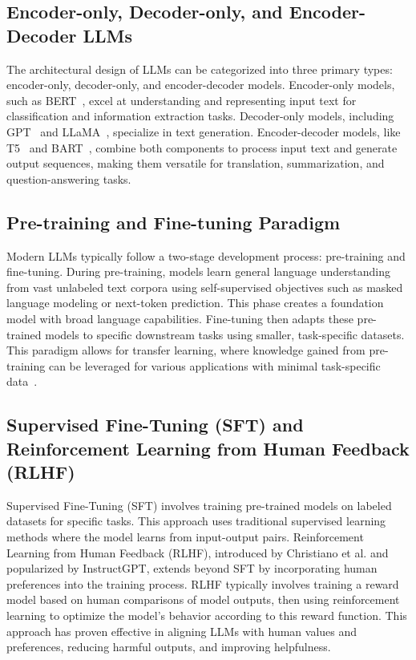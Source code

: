 \subsection{Encoder-only, Decoder-only, and Encoder-Decoder LLMs}
The architectural design of LLMs can be categorized into three primary 
types: encoder-only, decoder-only, and encoder-decoder models.
Encoder-only models, such as BERT~\cite{devlin2019}, excel at understanding
and representing input text for classification and information extraction 
tasks. Decoder-only models, including GPT~\cite{brown2020} and 
LLaMA~\cite{grattafiori2024llama3herdmodels}, specialize in text 
generation. Encoder-decoder models, like T5~\cite{ni2021sentencet5scalablesentenceencoders} and 
BART~\cite{lewis2019bartdenoisingsequencetosequencepretraining}, combine 
both components to process input text and generate output sequences, 
making them versatile for translation, summarization, and question-answering tasks.
\subsection{Pre-training and Fine-tuning Paradigm}
Modern LLMs typically follow a two-stage development process: pre-training 
and fine-tuning. During pre-training, models learn general language 
understanding from vast unlabeled text corpora using self-supervised 
objectives such as masked language modeling or next-token prediction. 
This phase creates a foundation model with broad language capabilities. 
Fine-tuning then adapts these pre-trained models to specific downstream 
tasks using smaller, task-specific datasets. This paradigm allows for 
transfer learning, where knowledge gained from pre-training can be 
leveraged for various applications with minimal task-specific 
data~\cite{howard2018}.
\subsection{Supervised Fine-Tuning (SFT) and Reinforcement Learning from Human Feedback (RLHF)}
Supervised Fine-Tuning (SFT) involves training pre-trained models on 
labeled datasets for specific tasks. This approach uses traditional 
supervised learning methods where the model learns from input-output pairs. 
Reinforcement Learning from Human Feedback (RLHF), introduced by Christiano 
et al.\cite{christiano2017} and popularized by InstructGPT\cite{ouyang2022}, 
extends beyond SFT by incorporating human preferences into the training 
process. RLHF typically involves training a reward model based on human 
comparisons of model outputs, then using reinforcement learning to optimize 
the model's behavior according to this reward function. This approach has 
proven effective in aligning LLMs with human values and preferences, 
reducing harmful outputs, and improving helpfulness.
